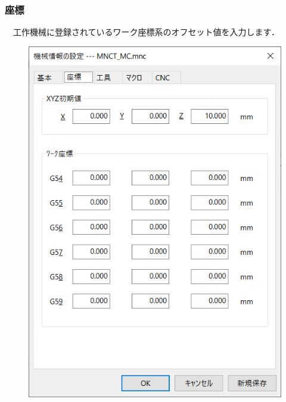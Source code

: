 \subsubsection{座標}
\begin{minipage}[t]{0.5\textwidth}
　工作機械に登録されているワーク座標系のオフセット値を入力します．
\end{minipage}
\begin{minipage}[t]{0.5\textwidth}
\vspace*{-2zh}
\begin{figure}[H]
\centering
\includegraphics[scale=0.7]{No6/fig/machine2.png}
\label{fig:machine2.png}
\end{figure}
\end{minipage}

